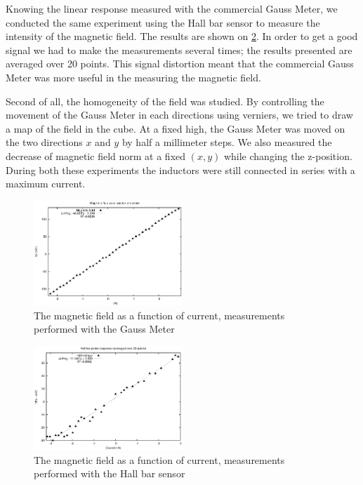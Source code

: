 \documentclass[journal,a4paper]{IEEEtran}
\begin{document}
Knowing the linear response measured with the commercial Gauss Meter, we conducted the same experiment using the Hall bar sensor to measure the intensity of the magnetic field. The results are shown on \figurename \ref{fig:linear_hall_20}. In order to get a good signal we had to make the measurements several times; the results presented are averaged over 20 points. This signal distortion meant that the commercial Gauss Meter was more useful in the measuring the magnetic field.

Second of all, the homogeneity of the field was studied. By controlling the movement of the Gauss Meter in each directions using verniers, we tried to draw a map of the field in the cube. At a fixed high, the Gauss Meter was moved on the two directions $x$ and $y$ by half a millimeter steps. We also measured the decrease of magnetic field norm at a fixed $(x,y)$ while changing the z-position. During both these experiments the inductors were still connected in series with a maximum current.





\begin{figure}[h]
\centering
\includegraphics[width=0.5\textwidth]{champ_fonction_courant.eps}
\caption{The magnetic field as a function of current, measurements performed with the Gauss Meter}
\label{fig:linear_gauss}
\end{figure}



\begin{figure}[h]
\centering

\includegraphics[width=0.5\textwidth]{rampe_courant_20.eps}
\caption{The magnetic field as a function of current, measurements performed with the Hall bar sensor}
\label{fig:linear_hall_20}
\end{figure}
\end{document}
